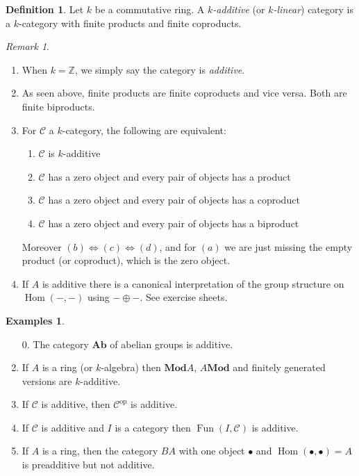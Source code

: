 \documentclass{article}
\newcommand{\op}{\mathrm{op}}
\newcommand{\Z}{\mathbb{Z}}
\newcommand{\cat}{\mathcal{C}}
\newcommand{\Mod}{\mathbf{Mod}}
\newcommand{\Ab}{\mathbf{Ab}}
\DeclareMathOperator{\Hom}{Hom}
\DeclareMathOperator{\Fun}{Fun}
\theoremstyle{plain}
\theoremstyle{definition}
\newtheorem{definition}[theorem]{Definition}
\newtheorem{examples}[theorem]{Examples}
\theoremstyle{remark}
\newtheorem*{remark}{Remark}
\begin{document}
\begin{definition}
    Let $k$ be a commutative ring. A \emph{$k$-additive} (or \emph{$k$-linear}) category is a $k$-category with finite products and finite coproducts.
\end{definition}

\begin{remark} \leavevmode
    \begin{enumerate}
        \item When $k = \Z$, we simply say the category is \emph{additive}.
        \item As seen above, finite products are finite coproducts and vice versa. Both are finite biproducts.
        \item For $\cat$ a $k$-category, the following are equivalent:
        \begin{enumerate}
            \item $\cat$ is $k$-additive
            \item $\cat$ has a zero object and every pair of objects has a product
            \item $\cat$ has a zero object and every pair of objects has a coproduct
            \item $\cat$ has a zero object and every pair of objects has a biproduct
        \end{enumerate}
        Moreover $(b) \iff (c) \iff (d)$, and for $(a)$ we are just missing the empty product (or coproduct), which is the zero object.
        \item If $A$ is additive there is a canonical interpretation of the group structure on $\Hom(-,-)$ using $-\oplus -$. See exercise sheets.
    \end{enumerate}
\end{remark}

\begin{examples} \leavevmode
    \begin{enumerate}
        \item[0.] The category $\Ab$ of abelian groups is additive.
        \item If $A$ is a ring (or $k$-algebra) then $\Mod A$, $A \Mod$ and finitely generated versions are $k$-additive.
        \item If $\cat$ is additive, then $\cat^\op$ is additive.
        \item If $\cat$ is additive and $I$ is a category then $\Fun(I,\cat)$ is additive.
        \item If $A$ is a ring, then the category $BA$ with one object $\bullet$ and $\Hom(\bullet,\bullet) = A$ is preadditive but not additive. 
    \end{enumerate}
\end{examples}
\end{document}
